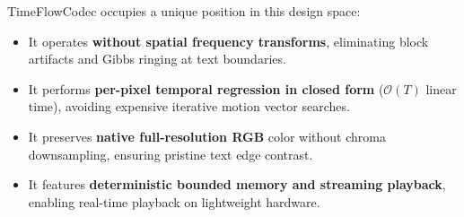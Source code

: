 TimeFlowCodec occupies a unique position in this design space:
\begin{itemize}
    \item It operates \textbf{without spatial frequency transforms}, eliminating block artifacts and Gibbs ringing at text boundaries.
    \item It performs \textbf{per-pixel temporal regression in closed form} ($\mathcal{O}(T)$ linear time), avoiding expensive iterative motion vector searches.
    \item It preserves \textbf{native full-resolution RGB} color without chroma downsampling, ensuring pristine text edge contrast.
    \item It features \textbf{deterministic bounded memory and streaming playback}, enabling real-time playback on lightweight hardware.
\end{itemize}
